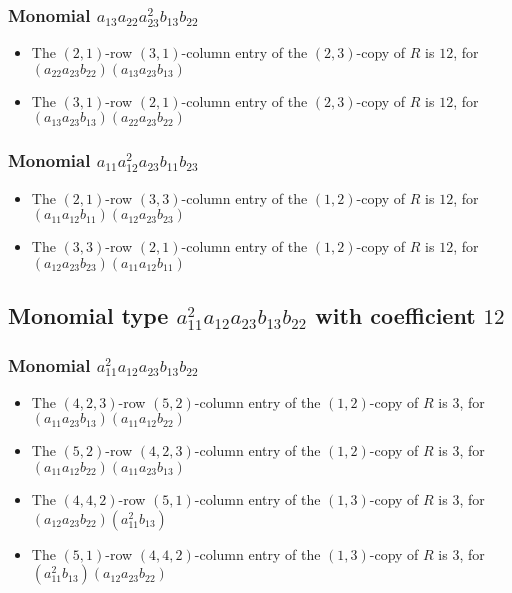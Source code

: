 \documentclass{article}
\begin{document}
\subsubsection{Monomial $ a_{13} a_{22} a_{23}^{2} b_{13} b_{22} $}

\begin{itemize}
\item The $(2, 1)$-row $(3, 1)$-column entry of the $ \left(2, 3\right) $-copy of $R$ is $ 12 $, for $( a_{22} a_{23} b_{22} )( a_{13} a_{23} b_{13} )$ 
\item The $(3, 1)$-row $(2, 1)$-column entry of the $ \left(2, 3\right) $-copy of $R$ is $ 12 $, for $( a_{13} a_{23} b_{13} )( a_{22} a_{23} b_{22} )$ 
\end{itemize}
\subsubsection{Monomial $ a_{11} a_{12}^{2} a_{23} b_{11} b_{23} $}

\begin{itemize}
\item The $(2, 1)$-row $(3, 3)$-column entry of the $ \left(1, 2\right) $-copy of $R$ is $ 12 $, for $( a_{11} a_{12} b_{11} )( a_{12} a_{23} b_{23} )$ 
\item The $(3, 3)$-row $(2, 1)$-column entry of the $ \left(1, 2\right) $-copy of $R$ is $ 12 $, for $( a_{12} a_{23} b_{23} )( a_{11} a_{12} b_{11} )$ 
\end{itemize}
\subsection{Monomial type $ a_{11}^{2} a_{12} a_{23} b_{13} b_{22} $ with coefficient $ 12 $}

\subsubsection{Monomial $ a_{11}^{2} a_{12} a_{23} b_{13} b_{22} $}

\begin{itemize}
\item The $(4, 2, 3)$-row $(5, 2)$-column entry of the $ \left(1, 2\right) $-copy of $R$ is $ 3 $, for $( a_{11} a_{23} b_{13} )( a_{11} a_{12} b_{22} )$ 
\item The $(5, 2)$-row $(4, 2, 3)$-column entry of the $ \left(1, 2\right) $-copy of $R$ is $ 3 $, for $( a_{11} a_{12} b_{22} )( a_{11} a_{23} b_{13} )$ 
\item The $(4, 4, 2)$-row $(5, 1)$-column entry of the $ \left(1, 3\right) $-copy of $R$ is $ 3 $, for $( a_{12} a_{23} b_{22} )( a_{11}^{2} b_{13} )$ 
\item The $(5, 1)$-row $(4, 4, 2)$-column entry of the $ \left(1, 3\right) $-copy of $R$ is $ 3 $, for $( a_{11}^{2} b_{13} )( a_{12} a_{23} b_{22} )$ 
\end{itemize}
\end{document}
